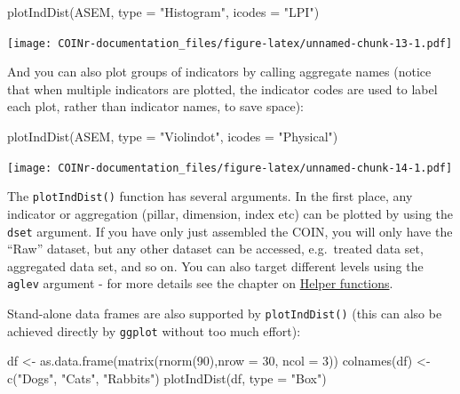 \documentclass[
]{book}
\newenvironment{Shaded}{\begin{snugshade}}{\end{snugshade}}
\newcommand{\AttributeTok}[1]{\textcolor[rgb]{0.77,0.63,0.00}{#1}}
\newcommand{\DecValTok}[1]{\textcolor[rgb]{0.00,0.00,0.81}{#1}}
\newcommand{\FunctionTok}[1]{\textcolor[rgb]{0.00,0.00,0.00}{#1}}
\newcommand{\NormalTok}[1]{#1}
\newcommand{\OtherTok}[1]{\textcolor[rgb]{0.56,0.35,0.01}{#1}}
\newcommand{\StringTok}[1]{\textcolor[rgb]{0.31,0.60,0.02}{#1}}
\begin{document}
\begin{Shaded}
\begin{Highlighting}[]
\FunctionTok{plotIndDist}\NormalTok{(ASEM, }\AttributeTok{type =} \StringTok{"Histogram"}\NormalTok{, }\AttributeTok{icodes =} \StringTok{"LPI"}\NormalTok{)}
\end{Highlighting}
\end{Shaded}

\texttt{[image: COINr-documentation\_files/figure-latex/unnamed-chunk-13-1.pdf]}

And you can also plot groups of indicators by calling aggregate names (notice that when multiple indicators are plotted, the indicator codes are used to label each plot, rather than indicator names, to save space):

\begin{Shaded}
\begin{Highlighting}[]
\FunctionTok{plotIndDist}\NormalTok{(ASEM, }\AttributeTok{type =} \StringTok{"Violindot"}\NormalTok{, }\AttributeTok{icodes =} \StringTok{"Physical"}\NormalTok{)}
\end{Highlighting}
\end{Shaded}

\texttt{[image: COINr-documentation\_files/figure-latex/unnamed-chunk-14-1.pdf]}

The \texttt{plotIndDist()} function has several arguments. In the first place, any indicator or aggregation (pillar, dimension, index etc) can be plotted by using the \texttt{dset} argument. If you have only just assembled the COIN, you will only have the ``Raw'' dataset, but any other dataset can be accessed, e.g.~treated data set, aggregated data set, and so on. You can also target different levels using the \texttt{aglev} argument - for more details see the chapter on \protect\hyperlink{helper-functions}{Helper functions}.

Stand-alone data frames are also supported by \texttt{plotIndDist()} (this can also be achieved directly by \texttt{ggplot} without too much effort):

\begin{Shaded}
\begin{Highlighting}[]
\NormalTok{df }\OtherTok{\textless{}{-}} \FunctionTok{as.data.frame}\NormalTok{(}\FunctionTok{matrix}\NormalTok{(}\FunctionTok{rnorm}\NormalTok{(}\DecValTok{90}\NormalTok{),}\AttributeTok{nrow =} \DecValTok{30}\NormalTok{, }\AttributeTok{ncol =} \DecValTok{3}\NormalTok{))}
\FunctionTok{colnames}\NormalTok{(df) }\OtherTok{\textless{}{-}} \FunctionTok{c}\NormalTok{(}\StringTok{"Dogs"}\NormalTok{, }\StringTok{"Cats"}\NormalTok{, }\StringTok{"Rabbits"}\NormalTok{)}
\FunctionTok{plotIndDist}\NormalTok{(df, }\AttributeTok{type =} \StringTok{"Box"}\NormalTok{)}
\end{Highlighting}
\end{Shaded}
\end{document}
